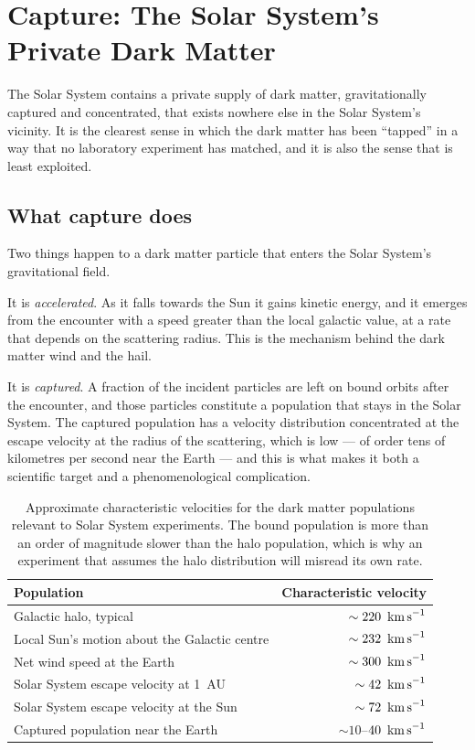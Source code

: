 
\chapter{Capture: The Solar System's Private Dark Matter}
\label{ch:capture}

The Solar System contains a private supply of dark matter, gravitationally
captured and concentrated, that exists nowhere else in the Solar System's
vicinity. It is the clearest sense in which the dark matter has been
``tapped'' in a way that no laboratory experiment has matched, and it is
also the sense that is least exploited.

\section{What capture does}Two things happen to a dark matter particle that
enters the Solar System's gravitational field.

It is \emph{accelerated}. As it falls towards the Sun it gains kinetic
energy, and it emerges from the encounter with a speed greater than the
local galactic value, at a rate that depends on the scattering radius. This
is the mechanism behind the dark matter wind and the hail.

It is \emph{captured}. A fraction of the incident particles are left on bound
orbits after the encounter, and those particles constitute a population that
stays in the Solar System. The captured population has a velocity
distribution concentrated at the escape velocity at the radius of the
scattering, which is low --- of order tens of kilometres per second near the
Earth --- and this is what makes it both a scientific target and a
phenomenological complication.

\begin{table}[H]
\centering
\caption{Approximate characteristic velocities for the dark matter populations
relevant to Solar System experiments. The bound population is more than an
order of magnitude slower than the halo population, which is why an
experiment that assumes the halo distribution will misread its own rate.}
\label{tab:velocities}
\begin{tabular}{@{}>{\RaggedRight\arraybackslash}p{}r@{}}
\toprule
\textbf{Population} & \textbf{Characteristic velocity} \\
\midrule
Galactic halo, typical & $\sim 220\ \kms$ \\
Local Sun's motion about the Galactic centre & $\sim 232\ \kms$ \\
Net wind speed at the Earth & $\sim 300\ \kms$ \\
Solar System escape velocity at 1~AU & $\sim 42\ \kms$ \\
Solar System escape velocity at the Sun & $\sim 72\ \kms$ \\
Captured population near the Earth & $\sim 10$--$40\ \,\mathrm{km\,s}^{-1}$ \\
\bottomrule
\end{tabular}
\end{table}


